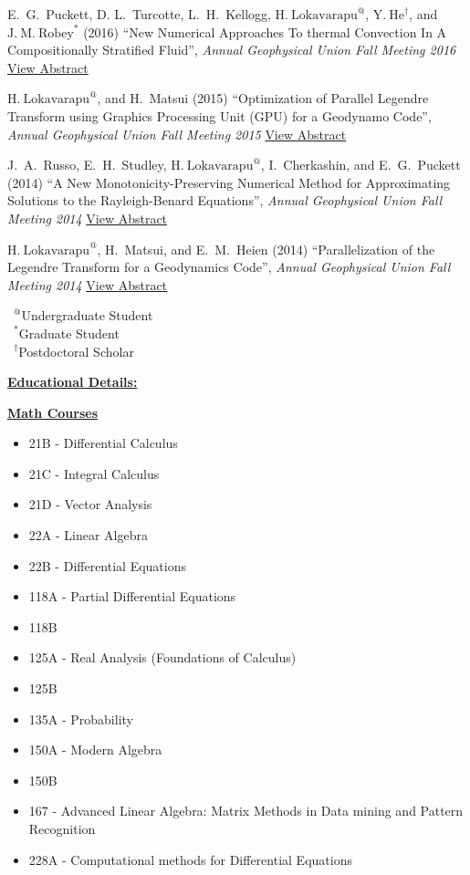 \documentclass[11pt]{ltxdoc}
\begin{document}
\hangindent 20pt
E.~G.~Puckett, D. L.~Turcotte, L.~H.~Kellogg, $\mathrm{H.~Lokavarapu}^{@}$,  $\mathrm{Y.~He}^{\dagger}$, and $\mathrm{J.~M.~Robey}^{*}$ (2016) 
``New Numerical Approaches To thermal Convection In A Compositionally Stratified Fluid'', 
\textit{Annual Geophysical Union Fall Meeting 2016}
\href{http://adsabs.harvard.edu/abs/2016AGUFMDI23A2589P}{View Abstract}

\hangindent 20pt
$\mathrm{H.~Lokavarapu}^{@}$, and H.~Matsui (2015) 
``Optimization of Parallel Legendre Transform using Graphics Processing Unit (GPU) for a Geodynamo Code'', 
\textit{Annual Geophysical Union Fall Meeting 2015}
\href{http://adsabs.harvard.edu/abs/2015AGUFMGP43B1253L}{View Abstract}

\hangindent 20pt
J.~A.~Russo, E.~H.~Studley, $\mathrm{H.~Lokavarapu}^{@}$, I.~Cherkashin, and E.~G.~Puckett (2014) 
``A New Monotonicity-Preserving Numerical Method for Approximating Solutions to the Rayleigh-Benard Equations'', 
\textit{Annual Geophysical Union Fall Meeting 2014}
\href{http://adsabs.harvard.edu/abs/2014AGUFMDI11A4258R}{View Abstract}

\hangindent 20pt
$\mathrm{H.~Lokavarapu}^{@}$, H.~Matsui, and E.~M.~Heien (2014) 
``Parallelization of the Legendre Transform for a Geodynamics Code'', 
\textit{Annual Geophysical Union Fall Meeting 2014}
\href{http://adsabs.harvard.edu/abs/2014AGUFMDI11A4255L}{View Abstract}

\vskip 18pt

$\phantom{0}^@$Undergraduate Student        \\
$\phantom{0}^*$Graduate Student             \\
$\phantom{0}^{\dagger}$Postdoctoral Scholar


\clearpage


\newpage

\begin{center}
  \textbf{\underline{Educational Details:}}
\end{center}

\noindent
\textbf{\underline{Math Courses}}
\begin{itemize} 
  \item 21B - Differential Calculus
  \item 21C - Integral Calculus
  \item 21D - Vector Analysis
  \item 22A - Linear Algebra
  \item 22B - Differential Equations
  \item 118A - Partial Differential Equations
  \item 118B
  \item 125A - Real Analysis (Foundations of Calculus)
  \item 125B
  \item 135A - Probability
  \item 150A - Modern Algebra
  \item 150B
  \item 167 - Advanced Linear Algebra: Matrix Methods in Data mining and Pattern Recognition
  \item 228A - Computational methods for Differential Equations
\end{itemize}
\end{document}
